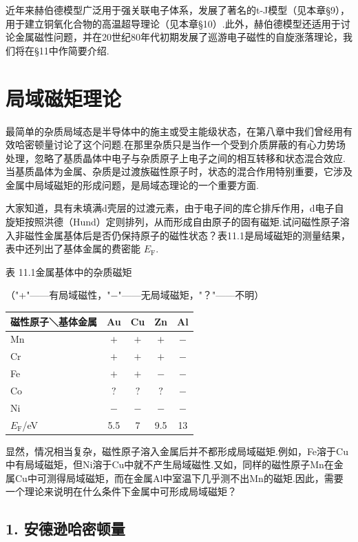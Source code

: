 近年来赫伯德模型广泛用于强关联电子体系，发展了著名的t-J模型（见本章§9），用于建立铜氧化合物的高温超导理论（见本章§10）.此外，赫伯德模型还适用于讨论金属磁性问题，并在20世纪80年代初期发展了巡游电子磁性的自旋涨落理论，我们将在§11中作简要介绍.

\section{局域磁矩理论}

最简单的杂质局域态是半导体中的施主或受主能级状态，在第八章中我们曾经用有效哈密顿量讨论了这个问题.在那里杂质只是当作一个受到介质屏蔽的有心力势场处理，忽略了基质晶体中电子与杂质原子上电子之间的相互转移和状态混合效应.当基质晶体为金属、杂质是过渡族磁性原子时，状态的混合作用特别重要，它涉及金属中局域磁矩的形成问题，是局域态理论的一个重要方面.

大家知道，具有未填满d壳层的过渡元素，由于电子间的库仑排斥作用，d电子自旋矩按照洪德（Hund）定则排列，从而形成自由原子的固有磁矩.试问磁性原子溶入非磁性金属基体后是否仍保持原子的磁性状态？表11.1是局域磁矩的测量结果，表中还列出了基体金属的费密能 $E_{\mathrm{F}}$.

表 11.1\quad 金属基体中的杂质磁矩

{\small （"+"——有局域磁性，"$-$"——无局域磁矩，"？"——不明）}

\begin{center}\small
\begin{tabular}{lcccc}
\hline
磁性原子＼基体金属 & Au & Cu & Zn & Al\\
\hline
Mn & $+$ & $+$ & $+$ & $-$\\
Cr & $+$ & $+$ & $+$ & $-$\\
Fe & $+$ & $+$ & $-$ & $-$\\
Co & $?$ & $?$ & $?$ & $-$\\
Ni & $-$ & $-$ & $-$ & $-$\\
$E_{\mathrm{F}}$/eV & 5.5 & 7 & 9.5 & 13\\
\hline
\end{tabular}
\end{center}

显然，情况相当复杂，磁性原子溶入金属后并不都形成局域磁矩.例如，Fe溶于Cu中有局域磁矩，但Ni溶于Cu中就不产生局域磁性.又如，同样的磁性原子Mn在金属Cu中可测得局域磁矩，而在金属Al中室温下几乎测不出Mn的磁矩.因此，需要一个理论来说明在什么条件下金属中可形成局域磁矩？

\subsection*{1. 安德逊哈密顿量}

